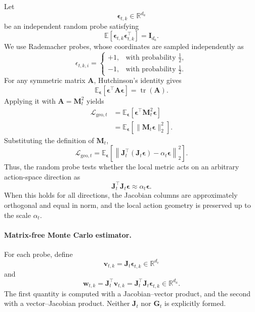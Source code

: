 ﻿\documentclass{article}
\begin{document}
Let
\[
\bm{\epsilon}_{t,k}\in\mathbb{R}^{d_a}
\]
be an independent random probe satisfying
\[
\mathbb{E}
\left[
\bm{\epsilon}_{t,k}\bm{\epsilon}_{t,k}^{\top}
\right]
=
\mathbf{I}_{d_a}.
\]
We use Rademacher probes, whose coordinates are sampled independently as
\[
\epsilon_{t,k,i}
=
\begin{cases}
+1, & \text{with probability } \tfrac{1}{2},\\
-1, & \text{with probability } \tfrac{1}{2}.
\end{cases}
\]
For any symmetric matrix \(\mathbf{A}\), Hutchinson's identity gives
\[
\mathbb{E}_{\bm{\epsilon}}
\left[
\bm{\epsilon}^{\top}\mathbf{A}\bm{\epsilon}
\right]
=
\operatorname{tr}(\mathbf{A}).
\]
Applying it with \(\mathbf{A}=\mathbf{M}_t^2\) yields
\[
\begin{aligned}
\mathcal{L}_{\mathrm{geo},t}
&=
\mathbb{E}_{\bm{\epsilon}}
\left[
\bm{\epsilon}^{\top}\mathbf{M}_t^2\bm{\epsilon}
\right] \\
&=
\mathbb{E}_{\bm{\epsilon}}
\left[
\|\mathbf{M}_t\bm{\epsilon}\|_2^2
\right].
\end{aligned}
\]
Substituting the definition of \(\mathbf{M}_t\),
\[
\boxed{
\mathcal{L}_{\mathrm{geo},t}
=
\mathbb{E}_{\bm{\epsilon}}
\left[
\left\|
\mathbf{J}_t^{\top}
\left(
\mathbf{J}_t\bm{\epsilon}
\right)
-
\alpha_t\bm{\epsilon}
\right\|_2^2
\right]
}.
\]
Thus, the random probe tests whether the local metric acts on an arbitrary
action-space direction as
\[
\mathbf{J}_t^{\top}\mathbf{J}_t\bm{\epsilon}
\approx
\alpha_t\bm{\epsilon}.
\]
When this holds for all directions, the Jacobian columns are approximately
orthogonal and equal in norm, and the local action geometry is preserved up
to the scale \(\alpha_t\).

\paragraph{Matrix-free Monte Carlo estimator.}
For each probe, define
\[
\mathbf{v}_{t,k}
=
\mathbf{J}_t\bm{\epsilon}_{t,k}
\in\mathbb{R}^{d_e}
\]
and
\[
\mathbf{w}_{t,k}
=
\mathbf{J}_t^{\top}\mathbf{v}_{t,k}
=
\mathbf{J}_t^{\top}\mathbf{J}_t\bm{\epsilon}_{t,k}
\in\mathbb{R}^{d_a}.
\]
The first quantity is computed with a Jacobian--vector product, and the
second with a vector--Jacobian product. Neither \(\mathbf{J}_t\) nor
\(\mathbf{G}_t\) is explicitly formed.
\end{document}
